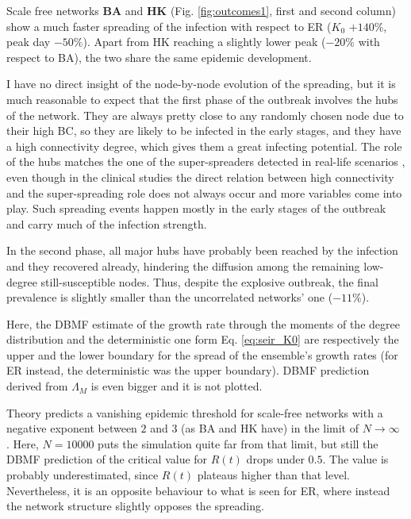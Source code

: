 \documentclass[DIV=12, BCOR=0pt]{scrartcl}  %
\begin{document}
  Scale free networks \textbf{BA} and \textbf{HK} (Fig. \ref{fig:outcomes1}, first and second column) show a much faster spreading of the infection with respect to ER ($K_0$ $+ 140 \%$, peak day $- 50 \%$). Apart from HK reaching a slightly lower peak ($- 20 \%$ with respect to BA), the two share the same epidemic development.
  
  I have no direct insight of the node-by-node evolution of the spreading, but it is much reasonable to expect that the first phase of the outbreak involves the hubs of the network. They are always pretty close to any randomly chosen node due to their high BC, so they are likely to be infected in the early stages, and they have a high connectivity degree, which gives them a great infecting potential. The role of the hubs matches the one of the super-spreaders detected in real-life scenarios \citep{Kissler2018}, even though in the clinical studies the direct relation between high connectivity and the super-spreading role does not always occur and more variables come into play. %
  Such spreading events happen mostly in the early stages of the outbreak and carry much of the infection strength.
  
  In the second phase, all major hubs have probably been reached by the infection and they recovered already, hindering the diffusion among the remaining low-degree still-susceptible nodes. Thus, despite the explosive outbreak, the final prevalence is slightly smaller than the uncorrelated networks' one ($- 11 \%$).
  
  Here, the DBMF estimate of the growth rate through the moments of the degree distribution and the deterministic one form Eq. \ref{eq:seir_K0} are respectively the upper and the lower boundary for the spread of the ensemble's growth rates (for ER instead, the deterministic was the upper boundary). DBMF prediction derived from $\Lambda_M$ is even bigger and it is not plotted. 
  
  Theory predicts a vanishing epidemic threshold for scale-free networks with a negative exponent between $2$ and $3$ (as BA and HK have) in the limit of $N \rightarrow \infty$ \citep{PastorSatorras}. Here, $N=10000$ puts the simulation quite far from that limit, but still the DBMF prediction of the critical value for $R(t)$ drops under $0.5$. The value is probably underestimated, since $R(t)$ plateaus higher than that level. Nevertheless, it is an opposite behaviour to what is seen for ER, where instead the network structure slightly opposes the spreading.
  
\end{document}
